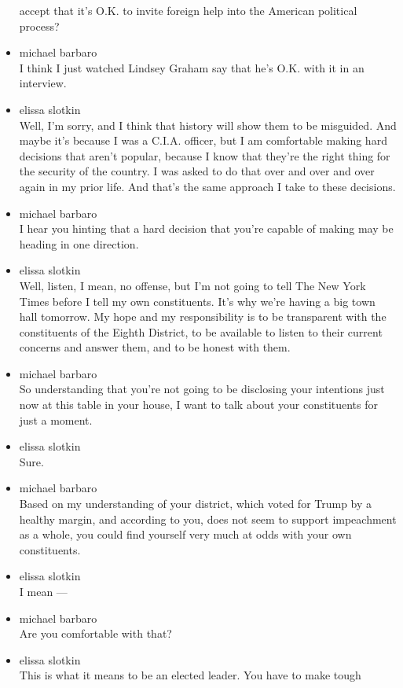 \begin{itemize}
  accept that it's O.K. to invite foreign help into the American
  political process?
\item
  michael barbaro\\
  I think I just watched Lindsey Graham say that he's O.K. with it in an
  interview.
\item
  elissa slotkin\\
  Well, I'm sorry, and I think that history will show them to be
  misguided. And maybe it's because I was a C.I.A. officer, but I am
  comfortable making hard decisions that aren't popular, because I know
  that they're the right thing for the security of the country. I was
  asked to do that over and over and over again in my prior life. And
  that's the same approach I take to these decisions.
\item
  michael barbaro\\
  I hear you hinting that a hard decision that you're capable of making
  may be heading in one direction.
\item
  elissa slotkin\\
  Well, listen, I mean, no offense, but I'm not going to tell The New
  York Times before I tell my own constituents. It's why we're having a
  big town hall tomorrow. My hope and my responsibility is to be
  transparent with the constituents of the Eighth District, to be
  available to listen to their current concerns and answer them, and to
  be honest with them.
\item
  michael barbaro\\
  So understanding that you're not going to be disclosing your
  intentions just now at this table in your house, I want to talk about
  your constituents for just a moment.
\item
  elissa slotkin\\
  Sure.
\item
  michael barbaro\\
  Based on my understanding of your district, which voted for Trump by a
  healthy margin, and according to you, does not seem to support
  impeachment as a whole, you could find yourself very much at odds with
  your own constituents.
\item
  elissa slotkin\\
  I mean ---
\item
  michael barbaro\\
  Are you comfortable with that?
\item
  elissa slotkin\\
  This is what it means to be an elected leader. You have to make tough

\end{itemize}
